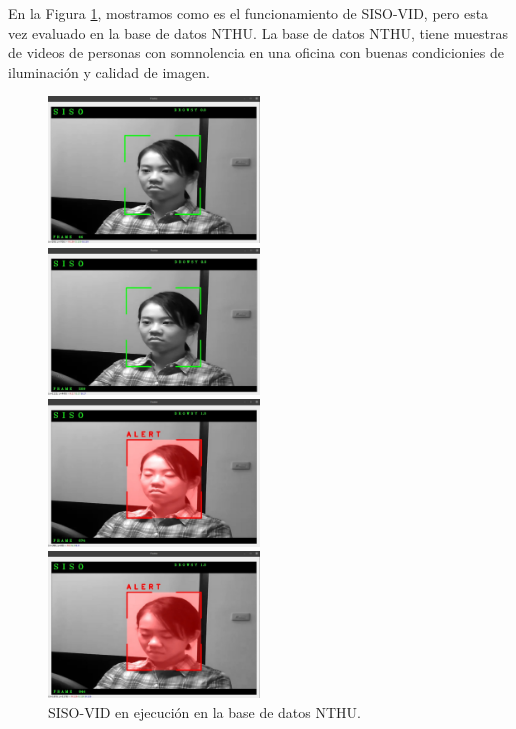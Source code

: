 \documentclass{article}
\begin{document}
	En la Figura \ref{img:siso_nthu}, mostramos como es el funcionamiento de SISO-VID, pero esta vez evaluado en la base de datos NTHU. La base de datos NTHU, tiene muestras de videos de personas con somnolencia en una oficina con buenas condicionies de iluminación y calidad de imagen.\\

	\begin{figure}[H]
		\centering
		\begin{multicols}{2}
			\includegraphics[width=0.5\textwidth,keepaspectratio]{img/sisi_vid9}\par 
			\includegraphics[width=0.5\textwidth,keepaspectratio]{img/sisi_vid10}\par 
			\includegraphics[width=0.5\textwidth,keepaspectratio]{img/sisi_vid11}\par 
			\includegraphics[width=0.5\textwidth,keepaspectratio]{img/sisi_vid12}\par 
		\end{multicols}
		\caption{SISO-VID en ejecución en la base de datos NTHU.}
		\label{img:siso_nthu}
	\end{figure}
	
\end{document}
